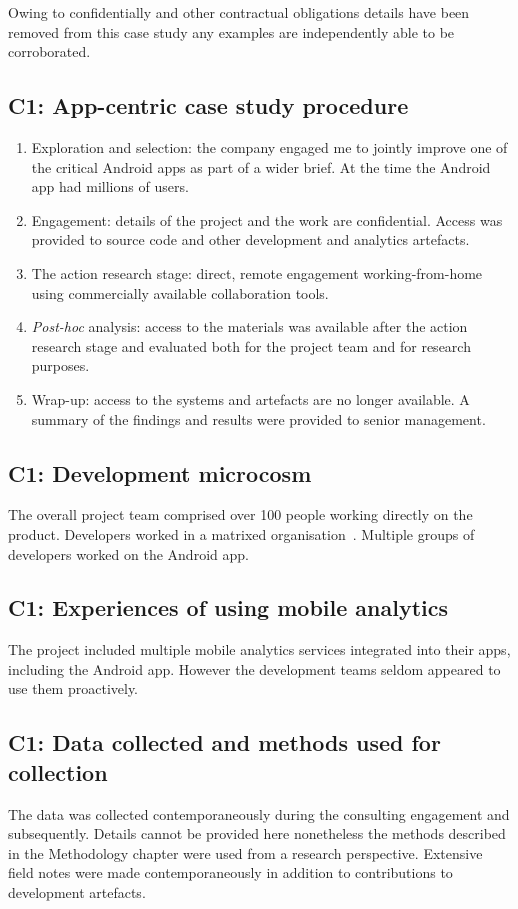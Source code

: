 Owing to confidentially and other contractual obligations details have been removed from this case study any examples are independently able to be corroborated. 


\subsection{C1: App-centric case study procedure}
{\small
\begin{enumerate}
    \itemsep0em
    \item Exploration and selection: the company engaged me to jointly improve one of the critical Android apps as part of a wider brief. At the time the Android app had millions of users.
    \item Engagement: details of the project and the work are confidential. Access was provided to source code and other development and analytics artefacts.
    \item The action research stage: direct, remote engagement working-from-home using commercially available collaboration tools.
    \item \textit{Post-hoc} analysis: access to the materials was available after the action research stage and evaluated both for the project team and for research purposes.
    \item Wrap-up: access to the systems and artefacts are no longer available. A summary of the findings and results were provided to senior management.
\end{enumerate}
}


\subsection{C1: Development microcosm}
The overall project team comprised over 100 people working directly on the product. Developers worked in a matrixed organisation~\citep[describes matrix organisations in detail]{stuckenbruck1979_the_matrix_organization}. Multiple groups of developers worked on the Android app. 

\subsection{C1: Experiences of using mobile analytics}
The project included multiple mobile analytics services integrated into their apps, including the Android app. However the development teams seldom appeared to use them proactively. 


\subsection{C1: Data collected and methods used for collection}
The data was collected contemporaneously during the consulting engagement and subsequently. Details cannot be provided here nonetheless the methods described in the Methodology chapter were used from a research perspective. Extensive field notes were made contemporaneously in addition to contributions to development artefacts. 

